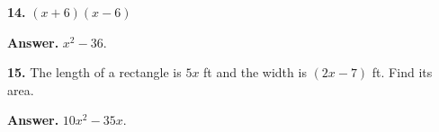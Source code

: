 \documentclass{ximera}
\begin{document}
\begin{problem}

\textbf{14.} $(x+6)(x-6)$

\begin{hint}
\textbf{Answer.} $x^{2} - 36$.
\end{hint}
\end{problem}

\begin{problem}

\textbf{15.} The length of a rectangle is $5x$ ft and the width is $(2x-7)$ ft. Find its area.

\begin{hint}
\textbf{Answer.} $10 x^{2} - 35 x$.
\end{hint}
\end{problem}
\end{document}
